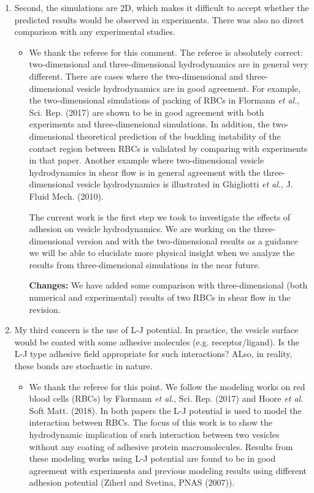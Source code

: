 \documentclass[11pt]{article}
\newcommand{\comment}[1]{{\color{blue} #1}}
\begin{document}
\begin{enumerate}
\begin{itemize}
  
\end{itemize}

\noindent
\item\comment{Second, the simulations are 2D, which makes it difficult to accept
whether the predicted results would be observed in experiments. There
was also no direct comparison with any experimental studies.}
\begin{itemize}
  \item We thank the referee for this comment. The referee is absolutely correct: two-dimensional and three-dimensional hydrodynamics are in general very different. There are
  cases where the two-dimensional and three-dimensional  vesicle hydrodynamics are in good agreement. For example, the two-dimensional simulations of packing of RBCs in Flormann {\it et al.}, Sci. Rep. (2017) are shown to be in good agreement with both experiments and three-dimensional simulations. In addition, the two-dimensional theoretical prediction of the buckling instability of the contact region between RBCs is validated by comparing with experiments in that paper.
  Another example where two-dimensional vesicle hydrodynamics in shear flow is in general agreement with the three-dimensional vesicle hydrodynamics is illustrated in Ghigliotti {\it et al.}, J. Fluid Mech. (2010). 
  
  The current work is the first step we took to investigate the effects of adhesion on vesicle hydrodynamics. We are working on the three-dimensional version  and with the two-dimensional results as a guidance we will be able to elucidate more physical insight when we analyze the results from three-dimensional simulations in the near future.
  
  \noindent
  {\bf Changes:} We have added some comparison with three-dimensional (both numerical and experimental) results of two RBCs in shear flow in the revision.
\end{itemize}

\noindent
\item\comment{My third concern is the use of L-J potential. In practice, the
vesicle surface would be coated with some adhesive molecules (e.g.
receptor/ligand). Is the L-J type adhesive field appropriate for such
interactions? ALso, in reality, these bonds are stochastic in nature.}
\begin{itemize}
  \item We thank the referee for this point. We follow the modeling works on red blood cells (RBCs) by Flormann {\it et al.}, Sci. Rep. (2017) and Hoore {\it et al.} Soft Matt. (2018).
  In both papers the L-J potential is used to model the interaction between RBCs. The focus of this work is to show the hydrodynamic implication of such interaction between two vesicles without any coating of adhesive protein macromolecules. Results from these modeling works using L-J potential are found to be in good agreement with experiments and previous modeling results using different adhesion potential (Ziherl and Svetina, PNAS (2007)).
  

\end{itemize}
\end{enumerate}
\end{document}
